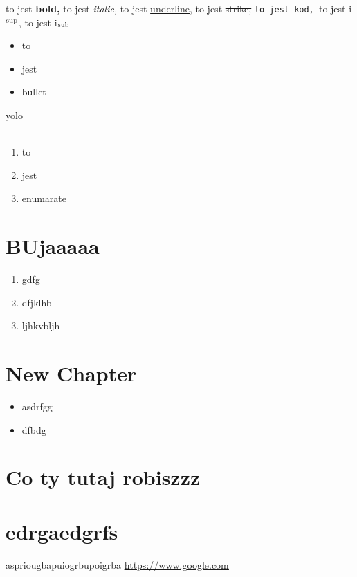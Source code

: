 \documentclass{article}
\begin{document}
to jest \textbf{bold, }to jest \textit{italic, }to jest \underline{underline,} to jest \sout{strike, }\texttt{to jest kod, }to jest i$^{\textnormal{sup}}$, to jest i$_{\textnormal{sub}}$\\\begin{itemize}\item to\item jest\item bullet\end{itemize}yolo\\\\\begin{enumerate}\item to\item jest\item enumarate\end{enumerate}

\section{BUjaaaaa}
\begin{enumerate}\item gdfg\item dfjklhb\item ljhkvbljh\end{enumerate}
\section{New Chapter}
\begin{itemize}\item asdrfgg\item dfbdg\end{itemize}
\section{Co ty tutaj robiszzz}
\section{edrgaedgrfs}
aspriougbapuiog\sout{rbupoigrba}
\underline{\url{https://www.google.com}}
\end{document}
